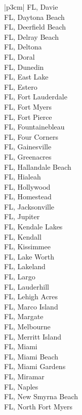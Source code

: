 \begin{customLongTable}{ |p{3cm}| }
FL, Davie \\ \hline
FL, Daytona Beach \\ \hline
FL, Deerfield Beach \\ \hline
FL, Delray Beach \\ \hline
FL, Deltona \\ \hline
FL, Doral \\ \hline
FL, Dunedin \\ \hline
FL, East Lake \\ \hline
FL, Estero \\ \hline
FL, Fort Lauderdale \\ \hline
FL, Fort Myers \\ \hline
FL, Fort Pierce \\ \hline
FL, Fountainebleau \\ \hline
FL, Four Corners \\ \hline
FL, Gainesville \\ \hline
FL, Greenacres \\ \hline
FL, Hallandale Beach \\ \hline
FL, Hialeah \\ \hline
FL, Hollywood \\ \hline
FL, Homestead \\ \hline
FL, Jacksonville \\ \hline
FL, Jupiter \\ \hline
FL, Kendale Lakes \\ \hline
FL, Kendall \\ \hline
FL, Kissimmee \\ \hline
FL, Lake Worth \\ \hline
FL, Lakeland \\ \hline
FL, Largo \\ \hline
FL, Lauderhill \\ \hline
FL, Lehigh Acres \\ \hline
FL, Marco Island \\ \hline
FL, Margate \\ \hline
FL, Melbourne \\ \hline
FL, Merritt Island \\ \hline
FL, Miami \\ \hline
FL, Miami Beach \\ \hline
FL, Miami Gardens \\ \hline
FL, Miramar \\ \hline
FL, Naples \\ \hline
FL, New Smyrna Beach \\ \hline
FL, North Fort Myers \\ \hline

\end{customLongTable}
